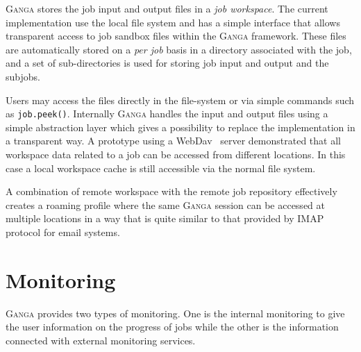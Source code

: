 \documentclass{elsart}
\def\ganga {\textsc{Ganga}\xspace}
\begin{document}
\ganga stores the job input and output files in a \emph{job workspace}. 
The current implementation use the local file system and has a simple
interface that allows transparent access to job sandbox files within the
\ganga framework. These files are automatically stored on a \emph{per job}
basis in a directory associated with the job, and a set of sub-directories is
used for storing job input and output and the subjobs.

Users may access the files directly in the file-system or via simple commands
such as \texttt{job.peek()}. Internally \ganga handles the input and output
files using a simple abstraction layer which gives a possibility to replace
the implementation in a transparent way. A prototype using a
WebDav~\cite{WebDav} server demonstrated that all workspace data related to a
job can be accessed from different locations. In this case a local workspace
cache is still accessible via the normal file system.

A combination of remote workspace with the remote job repository effectively
creates a roaming profile where the same \ganga session can be accessed at
multiple locations in a way that is quite similar to that provided by  IMAP \cite{IMAP}
protocol for email systems.

\section{Monitoring}
\label{sec:mon}
\ganga provides two types of monitoring. One is the internal monitoring to
give the user information on the progress of jobs while the other is the
information connected with external monitoring services.
\end{document}

